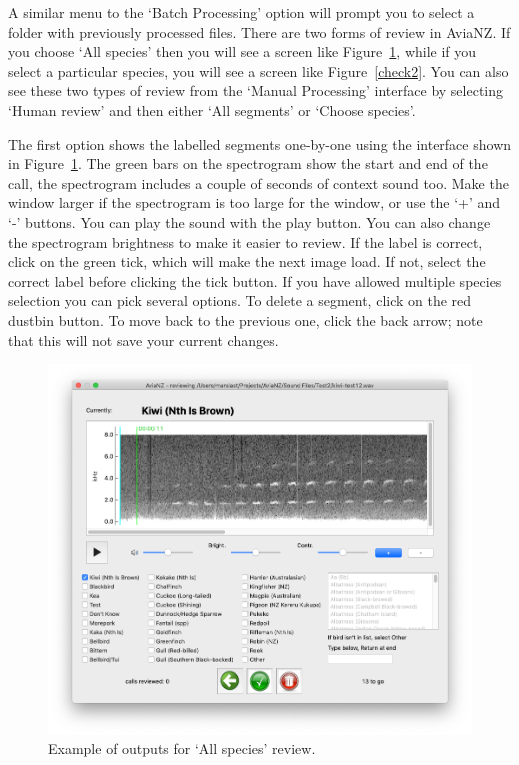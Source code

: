 \documentclass{article}
\begin{document}
A similar menu to the `Batch Processing' option will prompt you to select a folder with previously processed files. There are two forms of review in AviaNZ. 
If you choose `All species' then you will see a screen like Figure~\ref{check1}, while if you select a particular species, you will see a screen like Figure~\ref{check2}. You can also see these two types of review from the `Manual Processing' interface by selecting `Human review' and then either `All segments' or `Choose species'. 

The first option shows the labelled segments one-by-one using the interface shown in Figure~\ref{check1}. 
The green bars on the spectrogram show the start and end of the call, the spectrogram includes a couple of seconds of context sound too. Make the window larger if the spectrogram is too large for the window, or use the `+' and `-' buttons. You can play the sound with the play button. You can also change the spectrogram brightness to make it easier to review. If the label is correct, click on the green tick, which will make the next image load. If not, select the correct label before clicking the tick button. If you have allowed multiple species selection you can pick several options. To delete a segment, click on the red dustbin button. To move back to the previous one, click the back arrow; note that this will not save your current changes. 

	\begin{figure}
	\centering
	\includegraphics[width=.6\textwidth]{Figs/review1}
	\caption{Example of outputs for `All species' review.}
	\label{check1}
	\end{figure}
	
\end{document}
